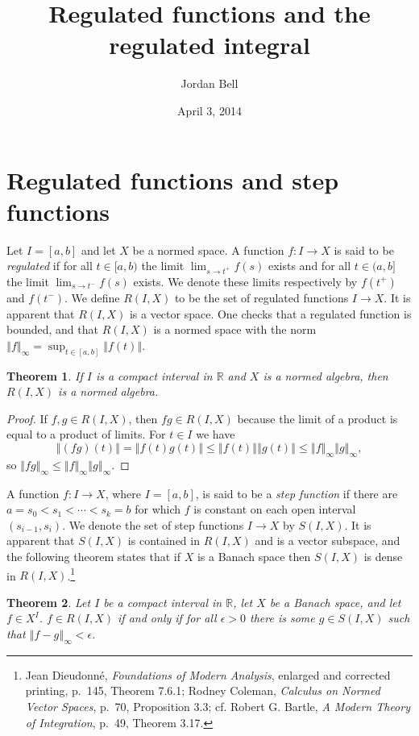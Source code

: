 \documentclass{article}
\newcommand{\norm}[1]{\left\Vert #1 \right\Vert}
\newtheorem{theorem}{Theorem}
\theoremstyle{definition}
\begin{document}
\title{Regulated functions and the regulated integral}
\author{Jordan Bell}
\date{April 3, 2014}

\maketitle

\section{Regulated functions and step functions}
Let $I=[a,b]$ and let $X$ be a normed space. A function $f:I \to X$ is said to be {\em regulated} if for all
$t \in [a,b)$ the limit $\lim_{s \to t^+} f(s)$ exists and for all $t \in (a,b]$ the limit $\lim_{s \to t^-} f(s)$ exists. 
We denote these limits respectively by $f(t^+)$ and $f(t^-)$.
We define $R(I,X)$ to be the set of regulated functions $I \to X$. It is apparent that $R(I,X)$ is a vector space. One checks that a regulated function is bounded,
and that $R(I,X)$ is a normed space with the norm
$\norm{f}_\infty=\sup_{t \in [a,b]} \norm{f(t)}$.

\begin{theorem}
If $I$ is a compact interval in $\mathbb{R}$ and $X$ is a normed algebra, then $R(I,X)$ is a normed algebra.
\end{theorem}
\begin{proof}
If $f,g \in R(I,X)$, then $fg \in R(I,X)$ because the limit of a product is equal to a product of limits. 
For $t \in I$ we have
\[
\norm{(fg)(t)} = \norm{f(t)g(t)} \leq \norm{f(t)}  \norm{g(t)} \leq \norm{f}_\infty \norm{g}_\infty,
\]
so $\norm{fg}_\infty \leq \norm{f}_\infty \norm{g}_\infty$. 
\end{proof}

A function $f:I \to X$, where $I=[a,b]$, is said to be a {\em step function} if there are $a=s_0<s_1<\cdots<s_k=b$ for which
$f$ is constant on each open interval $(s_{i-1},s_i)$.  
We denote the set of step functions $I \to X$ by $S(I,X)$. 
It is apparent that $S(I,X)$ is contained in $R(I,X)$ and is a vector subspace, and the following theorem states that if $X$ is a Banach space then $S(I,X)$ is dense in $R(I,X)$.\footnote{Jean Dieudonn\'e, {\em Foundations of Modern Analysis}, enlarged and corrected printing, p.~145, Theorem 7.6.1;
Rodney Coleman, {\em Calculus on Normed Vector Spaces}, p.~70, Proposition 3.3; 
cf. Robert G. Bartle, {\em A Modern Theory of
Integration}, p.~49, Theorem 3.17.}

\begin{theorem}
Let $I$ be a compact interval in $\mathbb{R}$, let $X$ be a Banach space, and let $f \in X^I$. $f \in R(I,X)$ 
if and only if for all $\epsilon>0$ there is some $g \in S(I,X)$ such that $\norm{f-g}_\infty<\epsilon$.
\label{stepdense}
\end{theorem}
\end{document}

